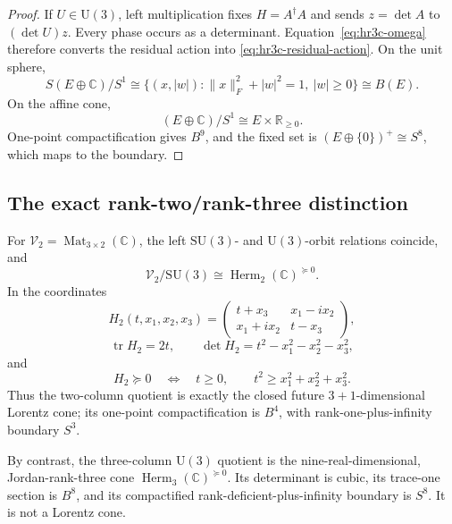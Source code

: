 \begin{proof}
If \(U\in\mathrm U(3)\), left multiplication fixes \(H=A^\dagger A\) and
sends \(z=\det A\) to \((\det U)z\).  Every phase occurs as a determinant.
Equation~\eqref{eq:hr3c-omega} therefore converts the residual action into
\eqref{eq:hr3c-residual-action}.  On the unit sphere,
\[
 S(E\oplus\mathbb C)/S^1
 \cong
 \{(x,|w|):\lVert x\rVert_F^2+|w|^2=1,\ |w|\geq0\}
 \cong B(E).
\]
On the affine cone,
\[
 (E\oplus\mathbb C)/S^1
 \cong E\times\mathbb R_{\geq0}.
\]
One-point compactification gives \(B^9\), and the fixed set is
\((E\oplus\{0\})^+\cong S^8\), which maps to the boundary.
\end{proof}

\subsection{The exact rank-two/rank-three distinction}
\label{subsec:hr3c-two-ladders}

\begin{theorem}
\label{thm:hr3c-two-ladders}
For
\(\mathscr V_2=\operatorname{Mat}_{3\times2}(\mathbb C)\), the left
\(\mathrm{SU}(3)\)- and \(\mathrm U(3)\)-orbit relations coincide, and
\begin{equation}
 \mathscr V_2/\mathrm{SU}(3)
 \cong
 \operatorname{Herm}_2(\mathbb C)^{\succeq0}.
 \label{eq:hr3c-two-column-quotient}
\end{equation}
In the coordinates
\begin{equation}
 H_2(t,x_1,x_2,x_3)=
 \begin{pmatrix}
  t+x_3&x_1-i x_2\\
  x_1+i x_2&t-x_3
 \end{pmatrix},
 \label{eq:hr3c-lorentz-coordinates}
\end{equation}
\begin{equation}
 \operatorname{tr}H_2=2t,
 \qquad
 \det H_2=t^2-x_1^2-x_2^2-x_3^2,
 \label{eq:hr3c-lorentz-determinant}
\end{equation}
and
\begin{equation}
 H_2\succeq0
 \quad\Longleftrightarrow\quad
 t\geq0,\qquad
 t^2\geq x_1^2+x_2^2+x_3^2.
 \label{eq:hr3c-lorentz-positivity}
\end{equation}
Thus the two-column quotient is exactly the closed future
\(3+1\)-dimensional Lorentz cone; its one-point compactification is
\(B^4\), with rank-one-plus-infinity boundary \(S^3\).

By contrast, the three-column \(\mathrm U(3)\) quotient is the
nine-real-dimensional, Jordan-rank-three cone
\(\operatorname{Herm}_3(\mathbb C)^{\succeq0}\).  Its determinant is cubic,
its trace-one section is \(B^8\), and its compactified
rank-deficient-plus-infinity boundary is \(S^8\).  It is not a Lorentz
cone.
\end{theorem}

